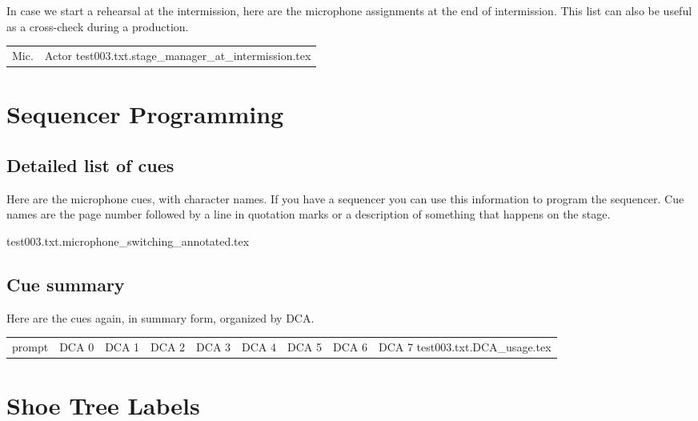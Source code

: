 \documentclass[letterpaper]{article}
\begin{document}
In case we start a rehearsal at the intermission, here are the microphone
assignments at the end of intermission.  This list can also be useful as a 
cross-check during a production.

\begin{center}
\begin{longtable}{|l|l|}
\hline Mic. & Actor \endhead \hline
 {test003.txt.stage_manager_at_intermission.tex}
\end{longtable}
\end{center}

\section {Sequencer Programming}

\subsection {Detailed list of cues}

Here are the microphone cues, with character names.  If you
have a sequencer you can use this information to program
the sequencer.  Cue names are the page number followed by a line
in quotation marks or a description of something that happens on
the stage.

 {test003.txt.microphone_switching_annotated.tex}

\subsection {Cue summary}

Here are the cues again, in summary form, organized by DCA.

\begin{center}
  \begin{longtable}{|p{0.75 in}|p{0.75 in}|p{0.75 in}|p{0.75 in}|p{0.75 in}|p{0.75 in}|p{0.75 in}|p{0.75 in}|p{0.75 in}|}    
    \hline prompt & DCA 0 & DCA 1 & DCA 2 & DCA 3 & DCA 4 & DCA 5 & DCA 6 & DCA 7\endhead \hline
     {test003.txt.DCA_usage.tex}
  \end{longtable}
\end{center}

\section {Shoe Tree Labels}
\end{document}
